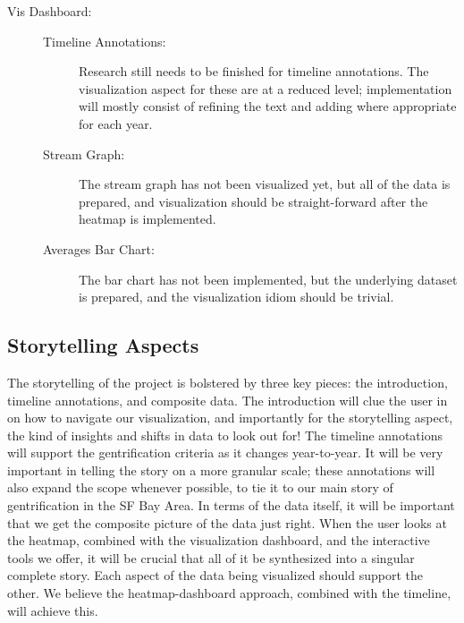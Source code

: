 \documentclass{article}
\begin{document}
\begin{description}
\begin{description}
        \item[Vis Dashboard:] \hfill
        
        \begin{description}
        
            \item[Timeline Annotations:] Research still needs to be finished for timeline annotations. The visualization aspect for these are at a reduced level; implementation will mostly consist of refining the text and adding where appropriate for each year.
            
            \item[Stream Graph:] The stream graph has not been visualized yet, but all of the data is prepared, and visualization should be straight-forward after the heatmap is implemented.
            
            \item[Averages Bar Chart:] The bar chart has not been implemented, but the underlying dataset is prepared, and the visualization idiom should be trivial. 
            
        \end{description}
        
    \end{description}
    
\end{description}

\subsection{Storytelling Aspects}

The storytelling of the project is bolstered by three key pieces: the introduction, timeline annotations, and composite data. The introduction will clue the user in on how to navigate our visualization, and importantly for the storytelling aspect, the kind of insights and shifts in data to look out for! The timeline annotations will support the gentrification criteria as it changes year-to-year. It will be very important in telling the story on a more granular scale; these annotations will also expand the scope whenever possible, to tie it to our main story of gentrification in the SF Bay Area. In terms of the data itself, it will be important that we get the composite picture of the data just right. When the user looks at the heatmap, combined with the visualization dashboard, and the interactive tools we offer, it will be crucial that all of it be synthesized into a singular complete story. Each aspect of the data being visualized should support the other. We believe the heatmap-dashboard approach, combined with the timeline, will achieve this.
    
\end{document}

